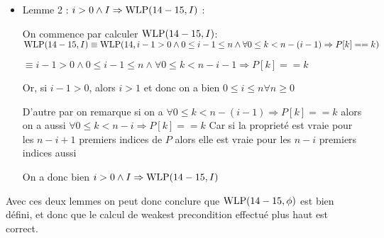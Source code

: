 \documentclass[11pt,answers]{exam}
\begin{document}
\begin{questions}
\begin{parts}
\begin{solutionorbox}
\begin{itemize}
            $\equiv i==0 \land \forall 0 \leq k < n \Rightarrow P[k] ==k \Rightarrow \forall 0\leq k < n-1 \Rightarrow P[k] < P[k+1] \land \forall  0 \leq k < n \Rightarrow 0 \leq P[k] < n \land \forall  0 \leq k < j < n \Rightarrow P[k] \not= P[j]$
        
            $\equiv i==0 \land \forall 0 \leq k < n \Rightarrow P[k] ==k \Rightarrow \forall 0\leq k < n-1 \Rightarrow P[k] < P[k+1] \equiv \top$

            Car $P[k+1]==k+1$ et $P[k]==k$ donc $P[k+1] > p[k]$

            $\equiv i==0 \land \forall 0 \leq k < n \Rightarrow P[k] ==k \Rightarrow \forall  0 \leq k < n \Rightarrow 0 \leq P[k] < n \equiv \top$

            Car $k$ est compris entre $0$ et $n-1$, et $P[k]==k$

            $\equiv i==0 \land \forall 0 \leq k < n \Rightarrow P[k] ==k \Rightarrow\land \forall  0 \leq k < j < n \Rightarrow P[k] \not= P[j]\equiv \top$

            Car $P[k]==k$ donc pour chaque indice différent, on a une valeur différente.

            On a donc bien $\neg i>0 \land I \Rightarrow \phi$ 
        \item   Lemme 2 :  $i>0 \land I \Rightarrow \mathrm{WLP}(14-15,I)$ :

                On commence par calculer $\mathrm{WLP}(14-15,I)$:
                $\mathrm{WLP}(14-15,I)\equiv \mathrm{WLP}(14,i-1>0 \land 0\leq i-1 \leq n \land \forall 0 \leq k < n-(i-1) \Rightarrow P[k] ==k)$

                $\equiv i-1>0 \land 0\leq i-1 \leq n \land \forall 0 \leq k < n-i-1 \Rightarrow P[k] ==k$

                Or, si $i-1>0$, alors $i>1$ et donc on a bien $0\leq i \leq n \forall n \geq 0$

                D'autre par on remarque si on a $\forall 0 \leq k < n-(i-1) \Rightarrow P[k] ==k$ alors on a aussi $\forall 0 \leq k < n-i \Rightarrow P[k] ==k$
                Car si la proprieté est vraie pour les $n-i+1$ premiers indices de $P$ alors elle est vraie pour les $n-i$ premiers indices aussi

                On a donc bien $i>0 \land I \Rightarrow \mathrm{WLP}(14-15,I)$
        \end{itemize}  
        
        Avec ces deux lemmes on peut donc conclure que $\mathrm{WLP}(14-15, \phi)$ est bien défini, et donc que le calcul de weakest precondition effectué plus haut est correct.


\end{solutionorbox}
\end{parts}
\end{questions}
\end{document}
